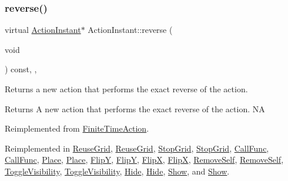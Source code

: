 \subsubsection{\texorpdfstring{reverse()}{reverse()}\hspace{0.1cm}{\footnotesize\ttfamily [1/2]}}
{\footnotesize\ttfamily virtual \hyperlink{classActionInstant}{Action\+Instant}$\ast$ Action\+Instant\+::reverse (\begin{DoxyParamCaption}\item[{void}]{ }\end{DoxyParamCaption}) const\hspace{0.3cm}{\ttfamily [inline]}, {\ttfamily [override]}, {\ttfamily [virtual]}}

Returns a new action that performs the exact reverse of the action.

\begin{DoxyReturn}{Returns}
A new action that performs the exact reverse of the action.  NA 
\end{DoxyReturn}


Reimplemented from \hyperlink{classFiniteTimeAction_a886bbdd2dc82167fe6ffae664c22dacc}{Finite\+Time\+Action}.



Reimplemented in \hyperlink{classReuseGrid_aeabc5f387fb58963ae2682799742a536}{Reuse\+Grid}, \hyperlink{classReuseGrid_ac5ec66174df4786da1005acbcb9b62a8}{Reuse\+Grid}, \hyperlink{classStopGrid_a8db549ab4f3da4564fadefb33f677517}{Stop\+Grid}, \hyperlink{classStopGrid_a02dcf952035340874d9b8a207e0c4da9}{Stop\+Grid}, \hyperlink{classCallFunc_aed2cda04eeffe75361b92ef8b15127eb}{Call\+Func}, \hyperlink{classCallFunc_a5c39f0a5cc14916897280a4a37cc7125}{Call\+Func}, \hyperlink{classPlace_a73cc4e23e9c1dd0856b99871537986d0}{Place}, \hyperlink{classPlace_aea55a3981ebe1aa3ad8fd4cd7bf26337}{Place}, \hyperlink{classFlipY_a1b49c042ac0ac7036ed1447f725e091d}{FlipY}, \hyperlink{classFlipY_a41c7c49f5a9cac8f174ce8eb79eb4d0d}{FlipY}, \hyperlink{classFlipX_a73b5cd89de0852721c49506eb02046ba}{FlipX}, \hyperlink{classFlipX_af626c89fa9e3c2881fe52a48eecef17d}{FlipX}, \hyperlink{classRemoveSelf_a5bd57faed537125c8f7db63d9dad293f}{Remove\+Self}, \hyperlink{classRemoveSelf_a687363c6f0d38c4be9b797b76a505648}{Remove\+Self}, \hyperlink{classToggleVisibility_aa406922563a2c5790e580653bc16c29e}{Toggle\+Visibility}, \hyperlink{classToggleVisibility_a4904108887e11c98fd1d536bb76b2d35}{Toggle\+Visibility}, \hyperlink{classHide_aed88024d6c8fc718c8e45307a158b913}{Hide}, \hyperlink{classHide_add2d09abe89637c2e68e4196384a6dd9}{Hide}, \hyperlink{classShow_a0fdc7cbefad3afaecfc0b8fdc71e9814}{Show}, and \hyperlink{classShow_a986a611688bc5f0252bb565682f52571}{Show}.

